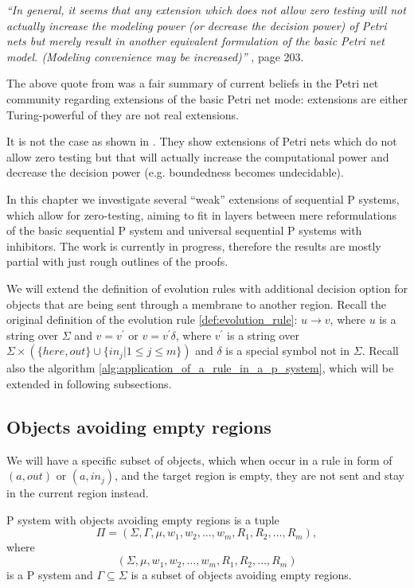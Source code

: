 {\em ``In general, it seems that any extension which does not allow zero testing will not actually increase the modeling power (or decrease the decision power) of Petri nets but merely result in another equivalent formulation of the basic Petri net model. (Modeling convenience may be increased)''} \cite{Peterson81PetriNets}, page 203.

The above quote from \cite{Peterson81PetriNets} was a fair summary of current beliefs in the Petri net community regarding extensions of the basic Petri net mode: extensions are either Turing-powerful of they are not real extensions.

It is not the case as shown in \cite{Dufourd98Reset}. They show extensions of Petri nets which do not allow zero testing but that will actually increase the computational power and decrease the decision power (e.g. boundedness becomes undecidable).

In this chapter we investigate several ``weak'' extensions of sequential P systems, which allow for zero-testing, aiming to fit in layers between mere reformulations of the basic sequential P system and universal sequential P systems with inhibitors. The work is currently in progress, therefore the results are mostly partial with just rough outlines of the proofs.

We will extend the definition of evolution rules with additional decision option for objects that are being sent through a membrane to another region. Recall the original definition of the evolution rule \ref{def:evolution_rule}: $u\rightarrow v$, where $u$ is a string over $\Sigma$ and $v=v^\prime$ or $v=v^\prime\delta$, where $v^\prime$ is a string over $\Sigma\times(\{here, out\}\cup\{in_j|1\leq j\leq m\})$ and $\delta$ is a special symbol not in $\Sigma$. Recall also the algorithm \ref{alg:application_of_a_rule_in_a_p_system}, which will be extended in following subsections.

\subsection{Objects avoiding empty regions} %
\label{sub:objects_avoiding_empty_regions}

We will have a specific subset of objects, which when occur in a rule in form of $(a, out)$ or $(a, in_j)$, and the target region is empty, they are not sent and stay in the current region instead.

\begin{definition}
  P system with objects avoiding empty regions is a tuple $$\Pi = (\Sigma, \Gamma, \mu, w_1, w_2,\ldots , w_m, R_1, R_2,\ldots , R_m),$$ where $$(\Sigma, \mu, w_1, w_2,\ldots , w_m, R_1, R_2,\ldots , R_m)$$ is a P system and $\Gamma\subseteq\Sigma$ is a subset of objects avoiding empty regions.
\end{definition}

